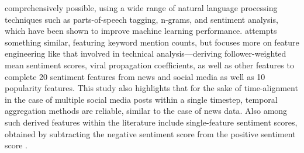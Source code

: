 \documentclass[stu,floatsintext]{apa7}
\begin{document}
comprehensively possible, using a wide range of natural language processing techniques such as parts-of-speech tagging, n-grams, and sentiment analysis, which have been shown to improve machine learning performance. \textcite{sun2026intelligent} attempts something similar, featuring keyword mention counts, but focuses more on feature engineering like that involved in technical analysis—deriving follower-weighted mean sentiment scores, viral propagation coefficients, as well as other features to complete 20 sentiment features from news and social media as well as 10 popularity features. This study also highlights that for the sake of time-alignment in the case of multiple social media posts within a single timestep, temporal aggregation methods are reliable, similar to the case of news data. Also among such derived features within the literature include single-feature sentiment scores, obtained by subtracting the negative sentiment score from the positive sentiment score \parencite{ridhawi2026stock}.
\end{document}
